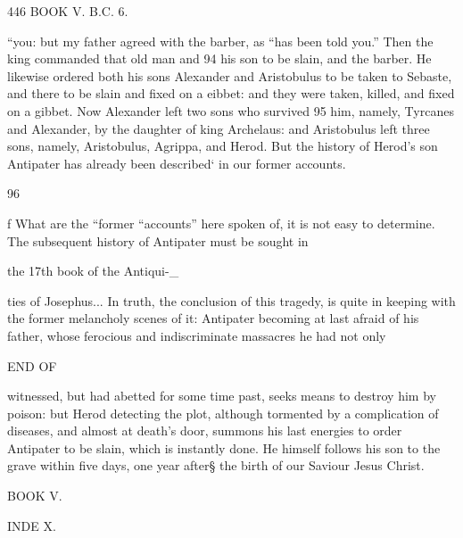 446 BOOK V. B.C. 6. 

“you: but my father agreed with the barber, as “has been told you.” 
Then the king commanded that old man and 94 his son to be slain, and the barber. He likewise ordered both his sons Alexander and Aristobulus to be taken to Sebaste, and there to be slain and fixed on a eibbet: and they were taken, killed, and fixed on a gibbet. 
Now Alexander left two sons who survived 95 him, namely, Tyrcanes and Alexander, by the daughter of king Archelaus: and Aristobulus left three sons, namely, Aristobulus, Agrippa, and Herod. But the history of Herod’s son Antipater has already been described‘ in our former accounts. 

96 

f What are the “former “accounts” here spoken of, it is not easy to determine. The subsequent history of Antipater must be sought in 

the 17th book of the Antiqui-_ 

ties of Josephus... In truth, the conclusion of this tragedy, is quite in keeping with the former melancholy scenes of it: Antipater becoming at last afraid of his father, whose ferocious and indiscriminate massacres he had not only 

END OF 

witnessed, but had abetted for some time past, seeks means to destroy him by poison: but Herod detecting the plot, although tormented by a complication of diseases, and almost at death’s door, summons his last energies to order Antipater to be slain, which is instantly done. He himself follows his son to the grave within five days, one year after§ the {birth} of our Saviour Jesus Christ. 

BOOK V. 

INDE X. 


